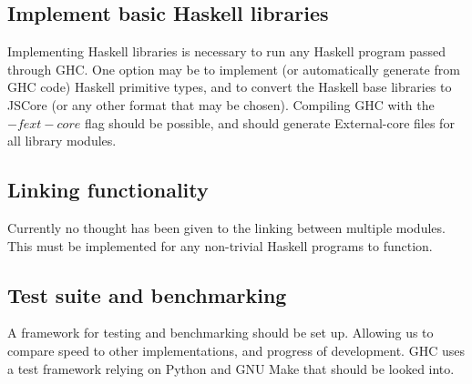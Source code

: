 \subsection{Implement basic Haskell libraries}

Implementing Haskell libraries is necessary to run any Haskell program passed 
through GHC. One option may be to implement (or automatically generate from GHC code) Haskell
primitive types, and to convert the Haskell base libraries to JSCore (or any other format that
may be chosen). Compiling GHC with the $-fext-core$ flag should be possible, and should generate
External-core files for all library modules.

\subsection{Linking functionality}

Currently no thought has been given to the linking between multiple modules. This
must be implemented for any non-trivial Haskell programs to function.

\subsection{Test suite and benchmarking}

A framework for testing and benchmarking should be set up. Allowing us to compare
speed to other implementations, and progress of development. GHC uses a test framework
relying on Python and GNU Make that should be looked into.

